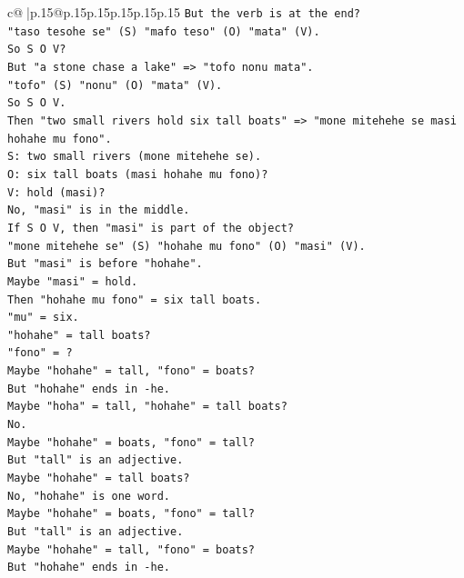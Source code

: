 \documentclass{article}
\begin{document}
{\begin{supertabular}{c@{$\;$}|p{.15\linewidth}@{}p{.15\linewidth}p{.15\linewidth}p{.15\linewidth}p{.15\linewidth}p{.15\linewidth}}
{{{\texttt{But the verb is at the end?} \\
\texttt{"taso tesohe se" (S) "mafo teso" (O) "mata" (V).} \\
\texttt{So S O V?} \\
\texttt{But "a stone chase a lake" => "tofo nonu mata".} \\
\texttt{"tofo" (S) "nonu" (O) "mata" (V).} \\
\texttt{So S O V.} \\
\texttt{Then "two small rivers hold six tall boats" => "mone mitehehe se masi hohahe mu fono".} \\
\texttt{S: two small rivers (mone mitehehe se).} \\
\texttt{O: six tall boats (masi hohahe mu fono)?} \\
\texttt{V: hold (masi)?} \\
\texttt{No, "masi" is in the middle.} \\
\texttt{If S O V, then "masi" is part of the object?} \\
\texttt{"mone mitehehe se" (S) "hohahe mu fono" (O) "masi" (V).} \\
\texttt{But "masi" is before "hohahe".} \\
\texttt{Maybe "masi" = hold.} \\
\texttt{Then "hohahe mu fono" = six tall boats.} \\
\texttt{"mu" = six.} \\
\texttt{"hohahe" = tall boats?} \\
\texttt{"fono" = ?} \\
\texttt{Maybe "hohahe" = tall, "fono" = boats?} \\
\texttt{But "hohahe" ends in {-}he.} \\
\texttt{Maybe "hoha" = tall, "hohahe" = tall boats?} \\
\texttt{No.} \\
\texttt{Maybe "hohahe" = boats, "fono" = tall?} \\
\texttt{But "tall" is an adjective.} \\
\texttt{Maybe "hohahe" = tall boats?} \\
\texttt{No, "hohahe" is one word.} \\
\texttt{Maybe "hohahe" = boats, "fono" = tall?} \\
\texttt{But "tall" is an adjective.} \\
\texttt{Maybe "hohahe" = tall, "fono" = boats?} \\
\texttt{But "hohahe" ends in {-}he.} \\
}}}
\end{supertabular}}
\end{document}
